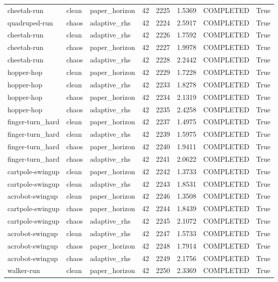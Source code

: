\begin{tabular}{llllllll}
cheetah-run & clean & paper\_horizon & 42 & 2225 & 1.5369 & COMPLETED & True \\
quadruped-run & chaos & adaptive\_rhs & 42 & 2224 & 2.5917 & COMPLETED & True \\
cheetah-run & clean & adaptive\_rhs & 42 & 2226 & 1.7592 & COMPLETED & True \\
cheetah-run & chaos & paper\_horizon & 42 & 2227 & 1.9978 & COMPLETED & True \\
cheetah-run & chaos & adaptive\_rhs & 42 & 2228 & 2.2442 & COMPLETED & True \\
hopper-hop & clean & paper\_horizon & 42 & 2229 & 1.7228 & COMPLETED & True \\
hopper-hop & clean & adaptive\_rhs & 42 & 2233 & 1.8278 & COMPLETED & True \\
hopper-hop & chaos & paper\_horizon & 42 & 2234 & 2.1319 & COMPLETED & True \\
hopper-hop & chaos & adaptive\_rhs & 42 & 2235 & 2.4258 & COMPLETED & True \\
finger-turn\_hard & clean & paper\_horizon & 42 & 2237 & 1.4975 & COMPLETED & True \\
finger-turn\_hard & clean & adaptive\_rhs & 42 & 2239 & 1.5975 & COMPLETED & True \\
finger-turn\_hard & chaos & paper\_horizon & 42 & 2240 & 1.9411 & COMPLETED & True \\
finger-turn\_hard & chaos & adaptive\_rhs & 42 & 2241 & 2.0622 & COMPLETED & True \\
cartpole-swingup & clean & paper\_horizon & 42 & 2242 & 1.3733 & COMPLETED & True \\
cartpole-swingup & clean & adaptive\_rhs & 42 & 2243 & 1.8531 & COMPLETED & True \\
acrobot-swingup & clean & paper\_horizon & 42 & 2246 & 1.3508 & COMPLETED & True \\
cartpole-swingup & chaos & paper\_horizon & 42 & 2244 & 1.8439 & COMPLETED & True \\
cartpole-swingup & chaos & adaptive\_rhs & 42 & 2245 & 2.1072 & COMPLETED & True \\
acrobot-swingup & clean & adaptive\_rhs & 42 & 2247 & 1.5733 & COMPLETED & True \\
acrobot-swingup & chaos & paper\_horizon & 42 & 2248 & 1.7914 & COMPLETED & True \\
acrobot-swingup & chaos & adaptive\_rhs & 42 & 2249 & 2.1756 & COMPLETED & True \\
walker-run & clean & paper\_horizon & 42 & 2250 & 2.3369 & COMPLETED & True \\

\end{tabular}
